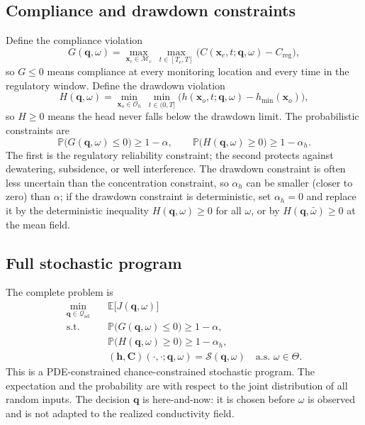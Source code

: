\documentclass[11pt]{article}
\numberwithin{equation}{section}
\newcommand{\E}{\mathbb{E}}
\newcommand{\Prob}{\mathbb{P}}
\newcommand{\xx}{\mathbf{x}}
\theoremstyle{plain}
\begin{document}
\subsection{Compliance and drawdown constraints}

Define the compliance violation
\begin{equation}
\label{eq:G}
G(\mathbf{q},\omega)
=\max_{\xx_c\in\mathcal{M}_c}\ \max_{t\in[T_c,T]}
\bigl(C(\xx_c,t;\mathbf{q},\omega)-C_{\mathrm{reg}}\bigr),
\end{equation}
so $G\le0$ means compliance at every monitoring location and every time in the
regulatory window.  Define the drawdown violation
\begin{equation}
\label{eq:H}
H(\mathbf{q},\omega)
=\min_{\xx_o\in\mathcal{O}_h}\ \min_{t\in(0,T]}
\bigl(h(\xx_o,t;\mathbf{q},\omega)-h_{\min}(\xx_o)\bigr),
\end{equation}
so $H\ge0$ means the head never falls below the drawdown limit.  The
probabilistic constraints are
\begin{equation}
\label{eq:chance}
\Prob\bigl(G(\mathbf{q},\omega)\le0\bigr)\ge1-\alpha,
\qquad
\Prob\bigl(H(\mathbf{q},\omega)\ge0\bigr)\ge1-\alpha_h.
\end{equation}
The first is the regulatory reliability constraint; the second protects
against dewatering, subsidence, or well interference.  The drawdown constraint
is often less uncertain than the concentration constraint, so
$\alpha_h$ can be smaller (closer to zero) than $\alpha$; if the drawdown
constraint is deterministic, set $\alpha_h=0$ and replace it by the
deterministic inequality $H(\mathbf{q},\omega)\ge0$ for all $\omega$, or by
$H(\mathbf{q},\bar\omega)\ge0$ at the mean field.

\subsection{Full stochastic program}

The complete problem is
\begin{equation}
\label{eq:stochprogram}
\boxed{
\begin{aligned}
\min_{\mathbf{q}\in\mathcal{Q}_{\mathrm{ad}}}\quad
& \E\bigl[J(\mathbf{q},\omega)\bigr]\\
\text{s.t.}\quad
& \Prob\bigl(G(\mathbf{q},\omega)\le0\bigr)\ge1-\alpha,\\
& \Prob\bigl(H(\mathbf{q},\omega)\ge0\bigr)\ge1-\alpha_h,\\
& (\mathbf{h},\mathbf{C})(\cdot,\cdot;\mathbf{q},\omega)
  =\mathcal{S}(\mathbf{q},\omega)
  \quad\text{a.s. }\omega\in\Theta.
\end{aligned}}
\end{equation}
This is a PDE-constrained chance-constrained stochastic program.  The
expectation and the probability are with respect to the joint distribution of
all random inputs.  The decision $\mathbf{q}$ is here-and-now: it is chosen
before $\omega$ is observed and is not adapted to the realized conductivity
field.
\end{document}
